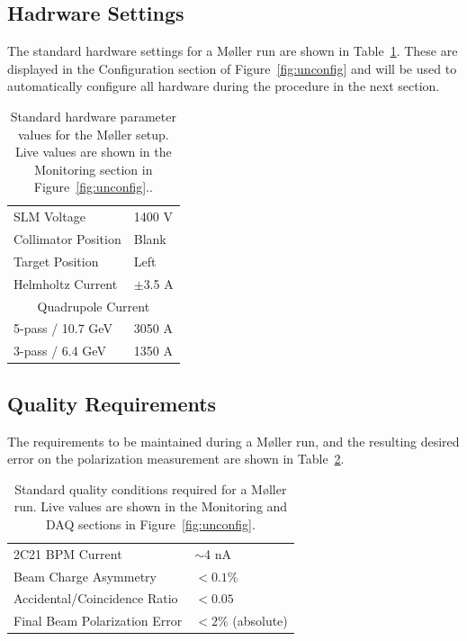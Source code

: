 \documentclass[amsmath,amssymb,notitlepage,12pt]{revtex4}
\begin{document}
\subsection{Hadrware Settings}
The standard hardware settings for a M{\o}ller run are shown in Table~\ref{tab:pars}.  These are displayed in the Configuration section of Figure~\ref{fig:unconfig} and will be used to automatically configure all hardware during the procedure in the next section.

\begin{table}[htbp]\centering
    \begin{tabular}{ll}\toprule[1.5pt]
        SLM Voltage & 1400 V \\
        Collimator Position & Blank \\
        Target Position & Left \\
        Helmholtz Current & $\pm$3.5 A \\
        \cmidrule[0.5pt]{1-2}
        \multicolumn{2}{c}{Quadrupole Current} \\
        5-pass / 10.7 GeV & 3050 A\\
        3-pass / 6.4 GeV & 1350 A\\
        \bottomrule[1.5pt]
    \end{tabular}
    \caption{Standard hardware parameter values for the M{\o}ller setup.  Live values are shown in the Monitoring section in Figure~\ref{fig:unconfig}.\label{tab:pars}.}
\end{table}

\subsection{Quality Requirements}\label{sec:quality}
The requirements to be maintained during a M{\o}ller run, and the resulting desired error on the polarization measurement are shown in Table~\ref{tab:reqs}.
\begin{table}[htbp]\centering
    \begin{tabular}{ll}\toprule[1.5pt]
        2C21 BPM Current & $\sim$4 nA\\
        Beam Charge Asymmetry & $<0.1\%$\\
        Accidental/Coincidence Ratio & $<0.05$ \\
        Final Beam Polarization Error & $<2\%$ (absolute)\\
        \bottomrule[1.5pt]
    \end{tabular}
    \caption{Standard quality conditions required for a M{\o}ller run.  Live values are shown in the Monitoring and DAQ sections in Figure~\ref{fig:unconfig}.\label{tab:reqs}}
\end{table}
\end{document}
